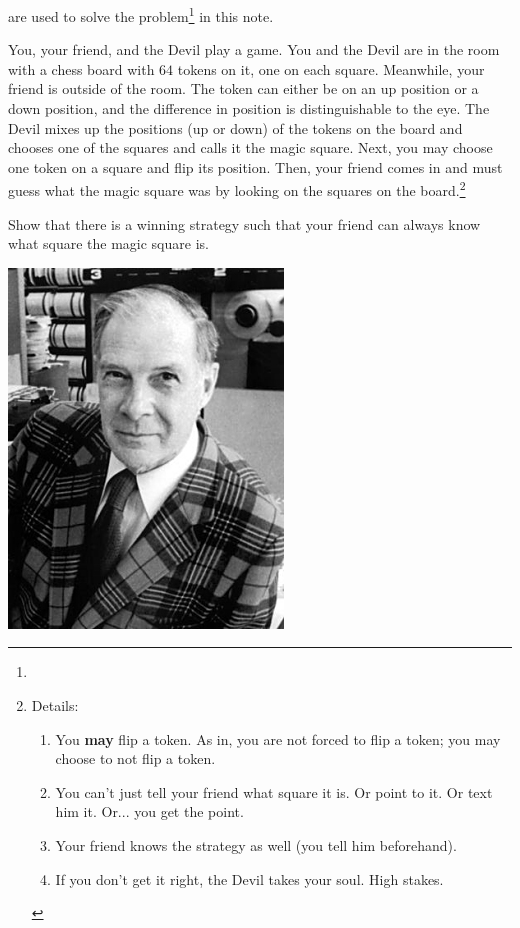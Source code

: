  are used to solve the problem\footnote{} in this note.

You, your friend, and the Devil play a game. You and the Devil are in the room with a chess board with $64$ tokens on it, one on each square. Meanwhile, your friend is outside of the room. The token can either be on an up position or a down position, and the difference in position is distinguishable to the eye. The Devil mixes up the positions (up or down) of the tokens on the board and chooses one of the  squares and calls it the magic square. Next, you may choose one token on a square and flip its position. Then, your friend comes in and must guess what the magic square was by looking on the squares on the board.\footnote{
Details:
\\
\begin{enumerate}
\item You \textbf{may} flip a token. As in, you are not forced to flip a token; you may choose to not flip a token.

\item You can't just tell your friend what square it is. Or point to it. Or text him it. Or... you get the point.

\item Your friend knows the strategy as well (you tell him beforehand).

\item If you don't get it right, the Devil takes your soul. High stakes.
\end{enumerate}}

\vspace{10 mm}
\begin{problem}
Show that there is a winning strategy such that your friend can always know what square the magic square is.
\end{problem}

\begin{marginfigure}[0.0in]
\includegraphics[scale=0.5]{Richard_Hamming.jpg}
\end{marginfigure}

